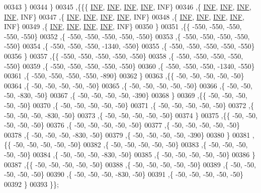 \begin{DoxyCode}
00343   \}
00344  \}
00345 ,\{\{\{   \hyperlink{constants_8h_a12c2040f25d8e3a7b9e1c2024c618cb6}{INF},   \hyperlink{constants_8h_a12c2040f25d8e3a7b9e1c2024c618cb6}{INF},   \hyperlink{constants_8h_a12c2040f25d8e3a7b9e1c2024c618cb6}{INF},   \hyperlink{constants_8h_a12c2040f25d8e3a7b9e1c2024c618cb6}{INF},   INF\}
00346   ,\{   \hyperlink{constants_8h_a12c2040f25d8e3a7b9e1c2024c618cb6}{INF},   \hyperlink{constants_8h_a12c2040f25d8e3a7b9e1c2024c618cb6}{INF},   \hyperlink{constants_8h_a12c2040f25d8e3a7b9e1c2024c618cb6}{INF},   \hyperlink{constants_8h_a12c2040f25d8e3a7b9e1c2024c618cb6}{INF},   INF\}
00347   ,\{   \hyperlink{constants_8h_a12c2040f25d8e3a7b9e1c2024c618cb6}{INF},   \hyperlink{constants_8h_a12c2040f25d8e3a7b9e1c2024c618cb6}{INF},   \hyperlink{constants_8h_a12c2040f25d8e3a7b9e1c2024c618cb6}{INF},   \hyperlink{constants_8h_a12c2040f25d8e3a7b9e1c2024c618cb6}{INF},   INF\}
00348   ,\{   \hyperlink{constants_8h_a12c2040f25d8e3a7b9e1c2024c618cb6}{INF},   \hyperlink{constants_8h_a12c2040f25d8e3a7b9e1c2024c618cb6}{INF},   \hyperlink{constants_8h_a12c2040f25d8e3a7b9e1c2024c618cb6}{INF},   \hyperlink{constants_8h_a12c2040f25d8e3a7b9e1c2024c618cb6}{INF},   INF\}
00349   ,\{   \hyperlink{constants_8h_a12c2040f25d8e3a7b9e1c2024c618cb6}{INF},   \hyperlink{constants_8h_a12c2040f25d8e3a7b9e1c2024c618cb6}{INF},   \hyperlink{constants_8h_a12c2040f25d8e3a7b9e1c2024c618cb6}{INF},   \hyperlink{constants_8h_a12c2040f25d8e3a7b9e1c2024c618cb6}{INF},   INF\}
00350   \}
00351  ,\{\{  -550,  -550,  -550,  -550,  -550\}
00352   ,\{  -550,  -550,  -550,  -550,  -550\}
00353   ,\{  -550,  -550,  -550,  -550,  -550\}
00354   ,\{  -550,  -550,  -550, -1340,  -550\}
00355   ,\{  -550,  -550,  -550,  -550,  -550\}
00356   \}
00357  ,\{\{  -550,  -550,  -550,  -550,  -550\}
00358   ,\{  -550,  -550,  -550,  -550,  -550\}
00359   ,\{  -550,  -550,  -550,  -550,  -550\}
00360   ,\{  -550,  -550,  -550, -1340,  -550\}
00361   ,\{  -550,  -550,  -550,  -550,  -890\}
00362   \}
00363  ,\{\{   -50,   -50,   -50,   -50,   -50\}
00364   ,\{   -50,   -50,   -50,   -50,   -50\}
00365   ,\{   -50,   -50,   -50,   -50,   -50\}
00366   ,\{   -50,   -50,   -50,  -830,   -50\}
00367   ,\{   -50,   -50,   -50,   -50,  -390\}
00368   \}
00369  ,\{\{   -50,   -50,   -50,   -50,   -50\}
00370   ,\{   -50,   -50,   -50,   -50,   -50\}
00371   ,\{   -50,   -50,   -50,   -50,   -50\}
00372   ,\{   -50,   -50,   -50,  -830,   -50\}
00373   ,\{   -50,   -50,   -50,   -50,   -50\}
00374   \}
00375  ,\{\{   -50,   -50,   -50,   -50,   -50\}
00376   ,\{   -50,   -50,   -50,   -50,   -50\}
00377   ,\{   -50,   -50,   -50,   -50,   -50\}
00378   ,\{   -50,   -50,   -50,  -830,   -50\}
00379   ,\{   -50,   -50,   -50,   -50,  -390\}
00380   \}
00381  ,\{\{   -50,   -50,   -50,   -50,   -50\}
00382   ,\{   -50,   -50,   -50,   -50,   -50\}
00383   ,\{   -50,   -50,   -50,   -50,   -50\}
00384   ,\{   -50,   -50,   -50,  -830,   -50\}
00385   ,\{   -50,   -50,   -50,   -50,   -50\}
00386   \}
00387  ,\{\{   -50,   -50,   -50,   -50,   -50\}
00388   ,\{   -50,   -50,   -50,   -50,   -50\}
00389   ,\{   -50,   -50,   -50,   -50,   -50\}
00390   ,\{   -50,   -50,   -50,  -830,   -50\}
00391   ,\{   -50,   -50,   -50,   -50,   -50\}
00392   \}
00393  \}\};
\end{DoxyCode}
